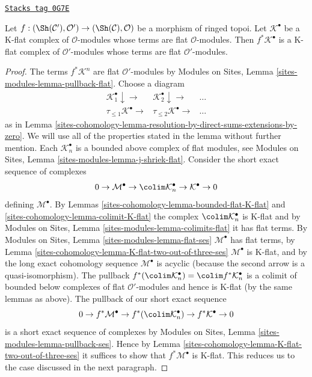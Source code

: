 \begin{lemma}
\label{sites-cohomology-lemma-pullback-K-flat}
\href{https://stacks.math.columbia.edu/tag/0G7E}{\texttt{Stacks tag 0G7E}}

Let $f : (\Sh(\mathcal{C}'), \mathcal{O}') \to (\Sh(\mathcal{C}), \mathcal{O})$
be a morphism of ringed topoi. Let $\mathcal{K}^\bullet$ be a K-flat complex
of $\mathcal{O}$-modules whose terms are flat $\mathcal{O}$-modules. Then
$f^*\mathcal{K}^\bullet$ is a K-flat complex of $\mathcal{O}'$-modules whose
terms are flat $\mathcal{O}'$-modules.
\end{lemma}

\begin{proof}
The terms $f^*\mathcal{K}^n$ are flat $\mathcal{O}'$-modules by
Modules on Sites, Lemma \ref{sites-modules-lemma-pullback-flat}.
Choose a diagram
$$
\begin{array}{ccc}\mathcal{K}_1^\bullet \downarrow\longrightarrow & \mathcal{K}_2^\bullet \downarrow\longrightarrow & \ldots \\ \tau_{\leq 1}\mathcal{K}^\bullet \longrightarrow & \tau_{\leq 2}\mathcal{K}^\bullet \longrightarrow & \ldots\end{array}
$$
as in Lemma \ref{sites-cohomology-lemma-resolution-by-direct-sums-extensions-by-zero}.
We will use all of the properties stated in the
lemma without further mention. Each $\mathcal{K}_n^\bullet$ is a bounded
above complex of flat modules, see
Modules on Sites, Lemma \ref{sites-modules-lemma-j-shriek-flat}.
Consider the short exact sequence of complexes
$$
0 \to \mathcal{M}^\bullet \to
\colim \mathcal{K}_n^\bullet \to
\mathcal{K}^\bullet \to 0
$$
defining $\mathcal{M}^\bullet$. By Lemmas \ref{sites-cohomology-lemma-bounded-flat-K-flat} and
\ref{sites-cohomology-lemma-colimit-K-flat} the complex $\colim \mathcal{K}_n^\bullet$
is K-flat and by Modules on Sites, Lemma \ref{sites-modules-lemma-colimits-flat}
it has flat terms. By Modules on Sites, Lemma \ref{sites-modules-lemma-flat-ses}
$\mathcal{M}^\bullet$ has flat terms, by
Lemma \ref{sites-cohomology-lemma-K-flat-two-out-of-three-ses}
$\mathcal{M}^\bullet$ is K-flat, and by the long exact
cohomology sequence $\mathcal{M}^\bullet$ is acyclic (because
the second arrow is a quasi-isomorphism). The pullback
$f^*(\colim \mathcal{K}_n^\bullet) = \colim f^*\mathcal{K}_n^\bullet$
is a colimit of bounded below complexes of flat $\mathcal{O}'$-modules
and hence is K-flat (by the same lemmas as above).
The pullback of our short exact sequence
$$
0 \to f^*\mathcal{M}^\bullet \to
f^*(\colim \mathcal{K}_n^\bullet) \to
f^*\mathcal{K}^\bullet \to 0
$$
is a short exact sequence of complexes by
Modules on Sites, Lemma \ref{sites-modules-lemma-pullback-ses}.
Hence by Lemma \ref{sites-cohomology-lemma-K-flat-two-out-of-three-ses}
it suffices to show that $f^*\mathcal{M}^\bullet$
is K-flat. This reduces us to the case discussed in the next paragraph.


\end{proof}

